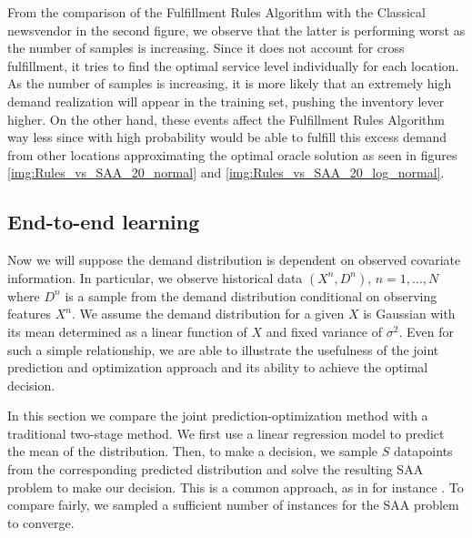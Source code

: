 \documentclass[poms,final,blindrev]{poms1_V1} %
\begin{document}
From the comparison of the Fulfillment Rules Algorithm with the Classical newsvendor in the second figure, we observe that the latter is performing worst as the number of samples is increasing. Since it does not account for cross fulfillment, it tries to find the optimal service level individually for each location. As the number of samples is increasing, it is more likely that an extremely high demand realization will appear in the training set, pushing the inventory lever higher. On the other hand, these events affect the Fulfillment Rules Algorithm way less since with high probability would be able to fulfill this excess demand from other locations approximating the optimal oracle solution as seen in figures \ref{img:Rules_vs_SAA_20_normal} and \ref{img:Rules_vs_SAA_20_log_normal}.

\subsection{End-to-end learning}
\label{section:end-to-end experiments}
Now we will suppose the demand distribution is dependent on observed covariate information. In particular, we observe historical data $(X^n, D^n)$, $n = 1, \dots, N$ where $D^n$ is a sample from the demand distribution conditional on observing features $X^n$. 
We assume the demand distribution for a given $X$ is Gaussian with its mean determined as a linear function of $X$ and fixed variance of $\sigma^2$. Even for such a simple relationship, we are able to illustrate the usefulness of the joint prediction and optimization approach and its ability to achieve the optimal decision. 

In this section we compare the joint prediction-optimization method with a traditional two-stage method. We first use a linear regression model to predict the mean of the distribution. Then, to make a decision, we sample $S$ datapoints from the corresponding predicted distribution and solve the resulting SAA problem to make our decision. This is a common approach, as in for instance \cite{perakis2020leveraging}. To compare fairly, we sampled a sufficient number of instances for the SAA problem to converge.


\end{document}
